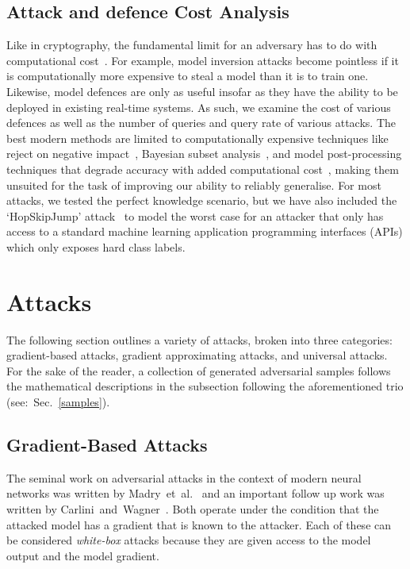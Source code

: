 \documentclass[journal]{IEEEtran}
\begin{document}
\subsection{Attack and defence Cost Analysis}

Like in cryptography, the fundamental limit for an adversary has to do with computational cost~\cite{hoffstein_pipher_silverman_2010}.
For example, model inversion attacks become pointless if it is computationally more expensive to steal a model than it is to train one.
Likewise, model defences are only as useful insofar as they have the ability to be deployed in existing real-time systems.
As such, we examine the cost of various defences as well as the number of queries and query rate of various attacks.
The best modern methods are limited to computationally expensive techniques like reject on negative impact~\cite{nelson2010behavior}, Bayesian subset analysis~\cite{bect_bayesian_2017}, and model post-processing techniques that degrade accuracy with added computational cost~\cite{athalye_obfuscated_2018,papernot,li_general_2016}, making them unsuited for the task of improving our ability to reliably generalise.
For most attacks, we tested the perfect knowledge scenario, but we have also included the `HopSkipJump' attack~\cite{hopskipjump} to model the worst case for an attacker that only has access to a standard machine learning application programming interfaces (APIs) which only exposes hard class labels.


\section{Attacks}
\label{attacks}

The following section outlines a variety of attacks, broken into three categories: gradient-based attacks, gradient approximating attacks, and universal attacks.
For the sake of the reader, a collection of generated adversarial samples follows the mathematical descriptions in the subsection following the aforementioned trio (see:~Sec.~\ref{samples}).

\subsection{Gradient-Based Attacks}

The seminal work on adversarial attacks in the context of modern neural networks was written by Madry~et~al.~\cite{madry2017towards} and an important follow up work was written by Carlini~and~Wagner~\cite{carlini_towards_2017}.
Both operate under the condition that the attacked model has a gradient that is known to the attacker.
Each of these can be considered \textit{white-box} attacks because they are given access to the model output and the model gradient.
\end{document}
